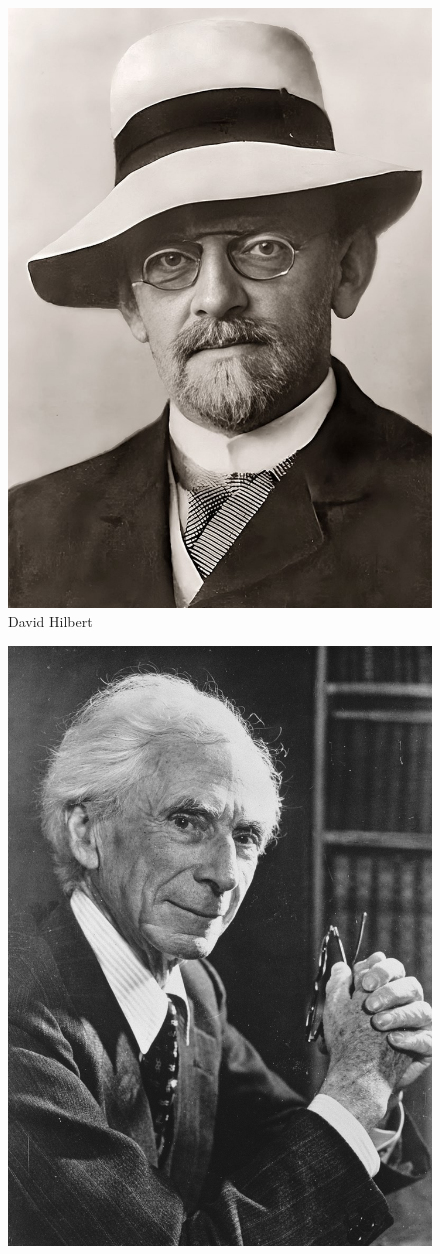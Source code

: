 \documentclass[
	aspectratio=169, %
	8pt, %
]{beamer}
\begin{document}
\begin{frame}{\insertsubsection}
				\begin{fancycolumns}[columns=4]
							\begin{figure}
									\centering\includegraphics[width=.75\linewidth]{images/David_Hilbert}
									\caption{David Hilbert}
							\end{figure}
			\nextcolumn
							\begin{figure}
									\centering\includegraphics[width=.75\linewidth]{images/Bertrand_Russell}

\end{figure}
\end{fancycolumns}
\end{frame}
\end{document}
